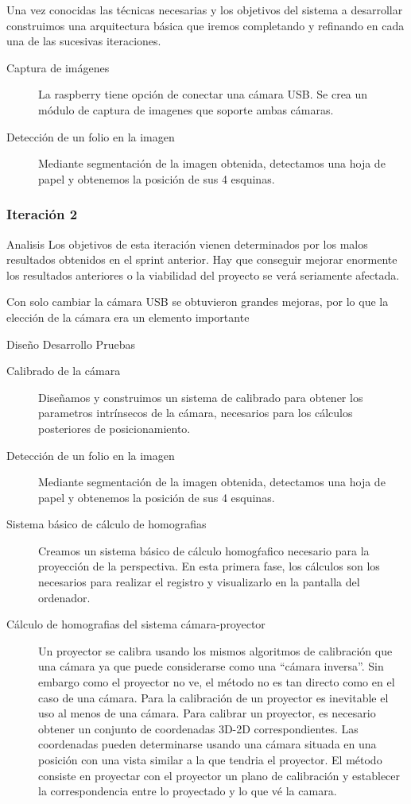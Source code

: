 \begin{description}

Una vez conocidas las técnicas necesarias y los objetivos del sistema a desarrollar construimos una arquitectura básica que iremos completando y refinando en cada una de las sucesivas iteraciones.
\begin{description}
\item [Captura de imágenes] La raspberry tiene opción de conectar una cámara USB. Se crea un módulo de captura de imagenes que soporte ambas cámaras.
\item [Detección de un folio en la imagen] Mediante segmentación de la imagen obtenida, detectamos una hoja de papel y obtenemos la posición de sus 4 esquinas.
\end{description}

\subsubsection{Iteración 2}
Analisis
Los objetivos de esta iteración vienen determinados por los malos resultados obtenidos en el sprint anterior. Hay que conseguir mejorar enormente los resultados anteriores o la viabilidad del proyecto se verá seriamente afectada.

Con solo cambiar la cámara USB se obtuvieron grandes mejoras, por lo que la elección de la cámara era un elemento importante


Diseño
Desarrollo
Pruebas







\begin{description}
\item [Calibrado de la cámara] Diseñamos y construimos un sistema de calibrado para obtener los parametros intrínsecos de la cámara, necesarios para los cálculos posteriores de posicionamiento.
\item [Detección de un folio en la imagen] Mediante segmentación de la imagen obtenida, detectamos una hoja de papel y obtenemos la posición de sus 4 esquinas.
\item [Sistema básico de cálculo de homografias] Creamos un sistema básico de cálculo homogŕafico necesario para la proyección de la perspectiva. En esta primera fase, los cálculos son los
  necesarios para realizar el registro y visualizarlo en la pantalla del ordenador.
\item [Cálculo de homografias del sistema cámara-proyector] Un proyector se calibra usando los mismos algoritmos de calibración que una cámara ya que puede considerarse como una ``cámara inversa''. Sin embargo como el proyector no ve, el método no es tan directo como en el caso de una cámara.
Para la calibración de un proyector es inevitable el uso al menos de una cámara. Para calibrar un proyector, es necesario obtener un conjunto de coordenadas 3D-2D correspondientes. Las coordenadas pueden determinarse usando una cámara situada en una posición con una vista similar a la que tendria el proyector. El método consiste en proyectar con el proyector un plano de calibración y establecer la correspondencia entre lo proyectado y lo que vé la camara.


\end{description}
\end{description}
